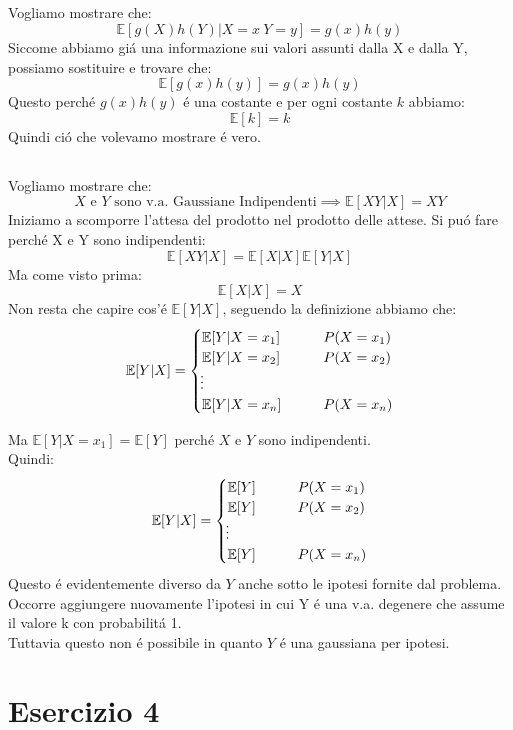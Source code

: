 \documentclass[a4paper]{article}
\newcommand{\E}[0]{\mathbb{E}}
\begin{document}
\subsection{}
Vogliamo mostrare che:
$$
\E[g(X)h(Y) | X = x \ Y = y] = g(x)h(y)
$$
Siccome abbiamo giá una informazione sui valori assunti dalla X e dalla Y, possiamo sostituire e trovare che:
$$
\E[g(x)h(y)] = g(x)h(y)
$$
Questo perché $g(x)h(y)$ é una costante e per ogni costante $k$ abbiamo:
$$
\E[k] = k
$$
Quindi ció che volevamo mostrare é vero.

\subsection{}
Vogliamo mostrare che:
$$
X \text{ e } Y \text{ sono v.a. Gaussiane Indipendenti} \implies \E[XY | X] = XY
$$
Iniziamo a scomporre l'attesa del prodotto nel prodotto delle attese. Si puó fare perché X e Y sono indipendenti:
$$
\E[XY | X] = \E[X | X]\E[Y | X]
$$
Ma come visto prima:
$$
\E[X | X] = X
$$
Non resta che capire cos'é $\E[Y | X]$, seguendo la definizione abbiamo che:
\begin{align}
	\E[Y | X]=
	\begin{cases}
		\E[Y | X = x_1] \qquad & P(X=x_1)\\
		\E[Y | X = x_2] \qquad & P(X=x_2)\\
        \vdotswithin{} \notag \\
		\E[Y | X = x_n] \qquad & P(X=x_n)\\
	\end{cases}
\end{align}

Ma $\E[Y | X = x_1] = \E[Y]$ perché $X$ e $Y$ sono indipendenti.\\
Quindi:
\begin{align}
	\E[Y | X]=
	\begin{cases}
		\E[Y] \qquad & P(X=x_1)\\
		\E[Y] \qquad & P(X=x_2)\\
        \vdotswithin{} \notag \\
		\E[Y] \qquad & P(X=x_n)\\
	\end{cases}
\end{align}
Questo é evidentemente diverso da $Y$ anche sotto le ipotesi fornite dal problema.\\
Occorre aggiungere nuovamente l'ipotesi in cui Y é una v.a. degenere che assume il valore k con probabilitá 1.\\
Tuttavia questo non é possibile in quanto $Y$ é una gaussiana per ipotesi.
\section{Esercizio 4}
\end{document}
